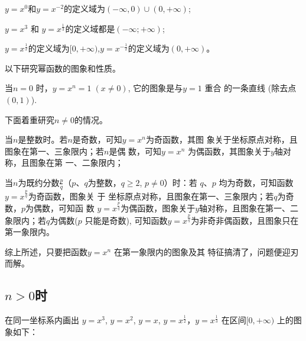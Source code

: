 \begin{solution}
$y=x^{0}$和$y=x^{-2}$的定义域为$(-\infty,0)\cup (0,+\infty)$;

$y=x^3$ 和 $y=x^{\tfrac13}$的定义域都是$(-\infty; +\infty)$;

$y=x^{\tfrac12}$的定义域为$[0, +\infty)$,\quad  $y=x^{-\tfrac12}$的定义域为$(0,+\infty)$。

\end{solution}

以下研究幂函数的图象和性质。

当$n=0$ 时，$y=x^{n}=1\; (x\neq0)$, 它的图象是与$y=1$ 重合
的一条直线 (除去点$(0,1)$).

下面着重研究$n\neq0$的情况。

当$n$是整数时。若$n$是奇数，可知$y=x^{n}$为奇函数，其图
象关于坐标原点对称，且图象在第一、三象限内；若$n$是偶
数，可知$y=x^n$
为偶函数，其图象关于$y$轴对称，且图象在第
一、二象限内；

当$n$为既约分数$\frac pq$（$p$、$q$为整数，$q{\geq}2$, $p{\neq}0$）时：若 $q$、$p$ 均为奇数，可知函数$y=x^{\tfrac pq}$为奇函数，图象关 于 坐标原点对称，且图象在第一、三象限内；若$q$为奇数，$p$为偶数，可知函 数 $y=x^{\tfrac pq}$为偶函数，图象关于$y$轴对称，且图象在第一、二象限内；若$q$为偶数($p$ 只能是奇数), 可知函数$y=x^{\tfrac pq}$为非奇非偶函数，且图象只在第一象限内。

综上所述，只要把函数$y=x^n$ 在第一象限内的图象及其
特征搞清了，问题便迎刃而解。

\subsection{$n>0$时}
在同一坐标系内画出
$y=x^3$, $y=x^2$, $y=x$, $y=x^{\tfrac{1}{2}}$，$y=x^{\tfrac{1}{3}}$
在区间$[0,+\infty)$
上的图象如下：
\begin{figure}[htp]
    \centering
{}
    \caption{}
\end{figure}

